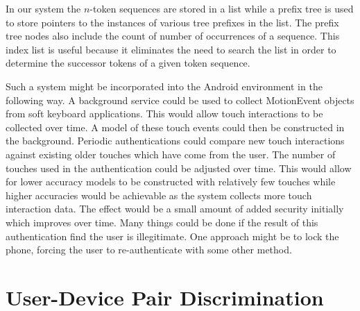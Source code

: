 \documentclass{acm_proc_article-sp}
\begin{document}
In our system the $n$-token sequences are stored in a list
while a prefix tree is used to store pointers to the
instances of various tree prefixes in the list.
The prefix tree nodes also include the count of number of occurrences of a sequence.
This index list is useful because it eliminates the need to search the list in order to determine the successor tokens of
a given token sequence.

Such a system might be incorporated 
into the Android environment in the following way.
A background service could be used to collect MotionEvent objects
from soft keyboard applications.
This would allow touch interactions to be collected over time.
A model of these touch events could then
be constructed in the background.
Periodic authentications could compare new touch interactions 
against existing older touches which have come from the user.
%
The number of touches used in the authentication could be
adjusted over time.
This would allow for lower accuracy models to be
constructed with relatively few touches while
higher accuracies would be achievable as
the system collects more touch interaction data.
The effect would be a small amount of added
security initially which improves over time.
%
Many things could be done if the result of this authentication
find the user is illegitimate.
One approach might be to lock the phone,
forcing the user to re-authenticate with some other method.

\section{User-Device Pair Discrimination}
\label{sec:differentiation}
\end{document}
